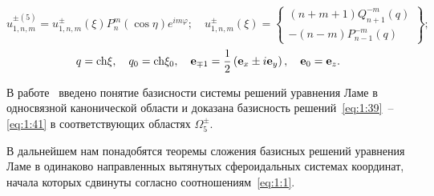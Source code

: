 \begin{equation*}
u_{1,n,m}^{ \pm (5)} = u_{1,n,m}^ \pm (\xi )P_n^m(\cos \eta ){e^{im\varphi }};\quad
u_{1,n,m}^ \pm (\xi ) = \left\{ \begin{array}{l}
(n + m + 1)Q_{n + 1}^{ - m}(q)\\
 - (n - m)P_{n - 1}^{ - m}(q)
\end{array} \right\};
\end{equation*}
\begin{equation}\label{eq:1:45}
q = {\mathop{\rm ch}\nolimits} \xi ,\quad {q_0} = {\mathop{\rm ch}\nolimits} {\xi _0},\quad {{\bf{e}}_{ \mp 1}} = \frac{1}{2}\left( {{{\bf{e}}_x} \pm i{{\bf{e}}_y}} \right),\quad {{\bf{e}}_0} = {{\bf{e}}_z}.
\end{equation}

В работе~\cite{Nikolaev1998} введено понятие базисности системы решений уравнения Ламе в односвязной канонической области и доказана базисность решений~\eqref{eq:1:39}~-- \eqref{eq:1:41} в соответствующих областях $\Omega _5^ \pm $.{\sloppy\par}

В дальнейшем нам понадобятся теоремы сложения базисных решений уравнения Ламе в одинаково направленных вытянутых сфероидальных системах координат, начала которых сдвинуты согласно соотношениям~\eqref{eq:1:1}.

